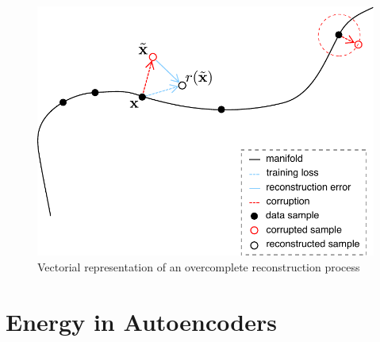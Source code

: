 \begin{figure}[!h]
\centering
\includegraphics[scale=0.55]{figures/reconstruction-denoising}
\caption[Vectorial representation of overcomplete AE]{Vectorial representation of an overcomplete reconstruction process}
\label{fig:reconstruction-dae}
\end{figure}


\section{Energy in Autoencoders}

